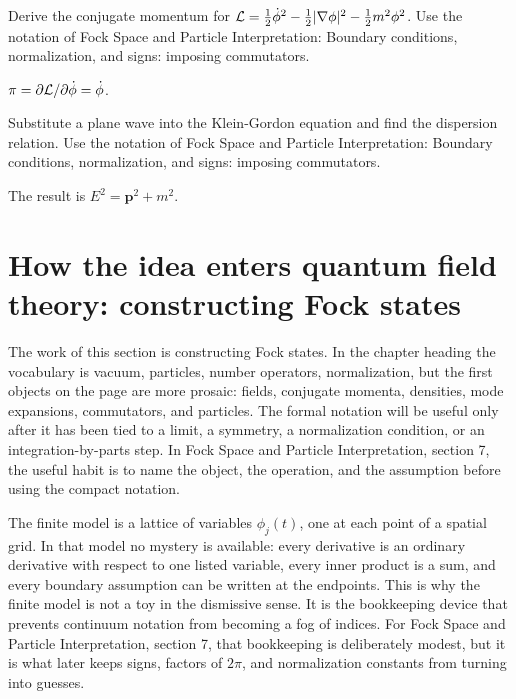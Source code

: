 \begin{exercise}
Derive the conjugate momentum for \(\mathcal L=\frac12\dot\phi^2-\frac12|\nabla\phi|^2-\frac12m^2\phi^2\).  Use the notation of Fock Space and Particle Interpretation: Boundary conditions, normalization, and signs: imposing commutators.
\begin{answer}
\(\pi=\partial\mathcal L/\partial\dot\phi=\dot\phi\).
\end{answer}
\end{exercise}

\begin{exercise}
Substitute a plane wave into the Klein-Gordon equation and find the dispersion relation.  Use the notation of Fock Space and Particle Interpretation: Boundary conditions, normalization, and signs: imposing commutators.
\begin{answer}
The result is \(E^2=\bm p^2+m^2\).
\end{answer}
\end{exercise}



\section{How the idea enters quantum field theory: constructing Fock states}

The work of this section is constructing Fock states.  In the chapter heading the vocabulary is vacuum, particles, number operators, normalization, but the first objects on the page are more prosaic: fields, conjugate momenta, densities, mode expansions, commutators, and particles.  The formal notation will be useful only after it has been tied to a limit, a symmetry, a normalization condition, or an integration-by-parts step.  In Fock Space and Particle Interpretation, section 7, the useful habit is to name the object, the operation, and the assumption before using the compact notation.

The finite model is a lattice of variables \(\phi_j(t)\), one at each point of a spatial grid.  In that model no mystery is available: every derivative is an ordinary derivative with respect to one listed variable, every inner product is a sum, and every boundary assumption can be written at the endpoints.  This is why the finite model is not a toy in the dismissive sense.  It is the bookkeeping device that prevents continuum notation from becoming a fog of indices.  For Fock Space and Particle Interpretation, section 7, that bookkeeping is deliberately modest, but it is what later keeps signs, factors of \(2\pi\), and normalization constants from turning into guesses.

